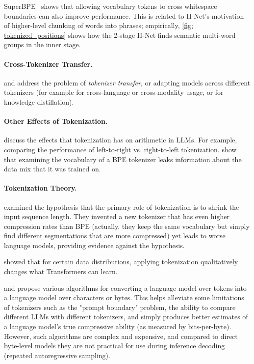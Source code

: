 \documentclass{article}
\newcommand{\citep}{\parencite}
\newcommand{\citet}{\textcite}
\theoremstyle{plain}
\theoremstyle{remark}
\begin{document}
SuperBPE~\citep{liu2025superbpe} shows that allowing vocabulary tokens to cross whitespace boundaries can also improve performance.
This is related to H-Net's motivation of higher-level chunking of words into phrases; empirically, \cref{fig: tokenized_positions} shows how the 2-stage H-Net finds semantic multi-word groups in the inner stage.

\paragraph{Cross-Tokenizer Transfer.}

\citet{minixhofer2024zero} and \citet{minixhofer2025universal}
address the problem of \emph{tokenizer transfer}, or adapting models across different tokenizers (for example for cross-language or cross-modality usage, or for knowledge distillation).

\paragraph{Other Effects of Tokenization.}

\citet{lee2024digitstodecisions} discuss the effects that tokenization has on arithmetic in LLMs. For example, comparing the performance of left-to-right vs. right-to-left tokenization.
\citet{hayase2024data} show that examining the vocabulary of a BPE tokenizer leaks information about the data mix that it was trained on.

\paragraph{Tokenization Theory.}

\citet{schmidt2024tokenization}
examined the hypothesis that the primary role of tokenization is to shrink the input sequence length. They invented a new tokenizer that has even higher compression rates than BPE (actually, they keep the same vocabulary but simply find different segmentations that are more compressed) yet leads to worse language models, providing evidence against the hypothesis.

\citet{rajaraman2024analysis} showed that for certain data distributions, applying tokenization qualitatively changes what Transformers can learn. 

\citet{phan2024exact} and \citet{vieira2024language} propose various algorithms for converting a language model over tokens into a language model over characters or bytes.
This helps alleviate some limitations of tokenizers such as the "prompt boundary" problem, the ability to compare different LLMs with different tokenizers, and simply produces better estimates of a language model's true compressive ability (as measured by bits-per-byte).
However, such algorithms are complex and expensive, and compared to direct byte-level models they are not practical for use during inference decoding (repeated autoregressive sampling).
\end{document}
